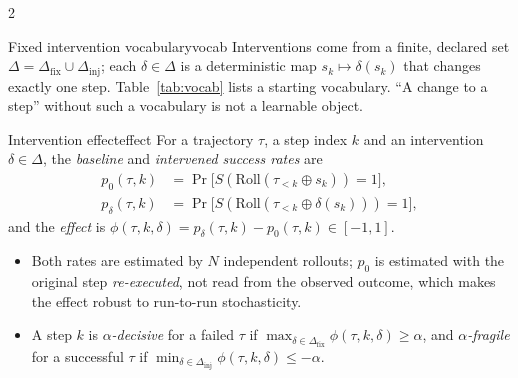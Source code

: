 \begin{multicols}{2}
\begin{assumption}{Fixed intervention vocabulary}{vocab}
Interventions come from a finite, declared set $\Delta=\Delta_{\mathrm{fix}}\cup\Delta_{\mathrm{inj}}$; each $\delta\in\Delta$ is a deterministic map $s_k\mapsto\delta(s_k)$ that changes exactly one step. Table~\ref{tab:vocab} lists a starting vocabulary. ``A change to a step'' without such a vocabulary is not a learnable object.
\end{assumption}

\begin{definition}{Intervention effect}{effect}
For a trajectory $\tau$, a step index $k$ and an intervention $\delta\in\Delta$, the \emph{baseline} and \emph{intervened success rates} are
\begin{align*}
p_0(\tau,k)&=\Pr\big[S(\mathrm{Roll}(\tau_{<k}\oplus s_k))=1\big],\\
p_\delta(\tau,k)&=\Pr\big[S(\mathrm{Roll}(\tau_{<k}\oplus\delta(s_k)))=1\big],
\end{align*}
and the \emph{effect} is $\phi(\tau,k,\delta)=p_\delta(\tau,k)-p_0(\tau,k)\in[-1,1]$.
\begin{itemize}[leftmargin=1.1em]
\item Both rates are estimated by $N$ independent rollouts; $p_0$ is estimated with the original step \emph{re-executed}, not read from the observed outcome, which makes the effect robust to run-to-run stochasticity.
\item A step $k$ is \emph{$\alpha$-decisive} for a failed $\tau$ if $\max_{\delta\in\Delta_{\mathrm{fix}}}\phi(\tau,k,\delta)\ge\alpha$, and \emph{$\alpha$-fragile} for a successful $\tau$ if $\min_{\delta\in\Delta_{\mathrm{inj}}}\phi(\tau,k,\delta)\le-\alpha$.
\end{itemize}
\end{definition}


\end{multicols}
